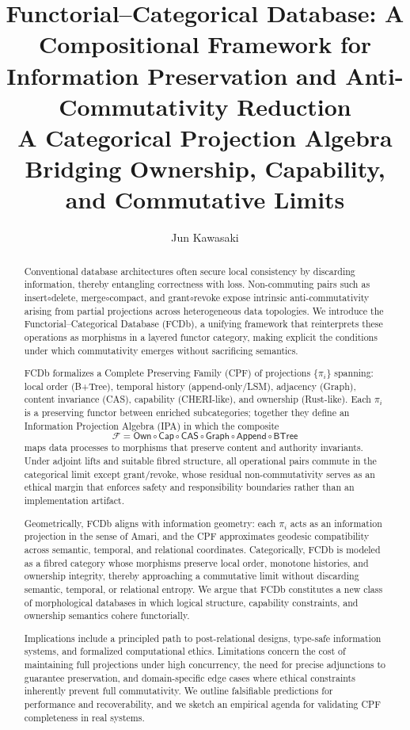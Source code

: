 \documentclass[10pt]{article}
\title{Functorial–Categorical Database: A Compositional Framework for Information Preservation and Anti-Commutativity Reduction\\
\large A Categorical Projection Algebra Bridging Ownership, Capability, and Commutative Limits}
\author{Jun Kawasaki}
\date{}
\begin{document}
\maketitle

\begin{abstract}
Conventional database architectures often secure local consistency by discarding information, thereby entangling correctness with loss. Non-commuting pairs such as insert$\circ$delete, merge$\circ$compact, and grant$\circ$revoke expose intrinsic anti-commutativity arising from partial projections across heterogeneous data topologies. We introduce the Functorial--Categorical Database (FCDb), a unifying framework that reinterprets these operations as morphisms in a layered functor category, making explicit the conditions under which commutativity emerges without sacrificing semantics.

FCDb formalizes a Complete Preserving Family (CPF) of projections $\{\pi_i\}$ spanning: local order (B+Tree), temporal history (append-only/LSM), adjacency (Graph), content invariance (CAS), capability (CHERI-like), and ownership (Rust-like). Each $\pi_i$ is a preserving functor between enriched subcategories; together they define an Information Projection Algebra (IPA) in which the composite
\[
\mathcal{F} = \mathsf{Own} \circ \mathsf{Cap} \circ \mathsf{CAS} \circ \mathsf{Graph} \circ \mathsf{Append} \circ \mathsf{BTree}
\]
maps data processes to morphisms that preserve content and authority invariants. Under adjoint lifts and suitable fibred structure, all operational pairs commute in the categorical limit except grant/revoke, whose residual non-commutativity serves as an ethical margin that enforces safety and responsibility boundaries rather than an implementation artifact.

Geometrically, FCDb aligns with information geometry: each $\pi_i$ acts as an information projection in the sense of Amari, and the CPF approximates geodesic compatibility across semantic, temporal, and relational coordinates. Categorically, FCDb is modeled as a fibred category whose morphisms preserve local order, monotone histories, and ownership integrity, thereby approaching a commutative limit without discarding semantic, temporal, or relational entropy. We argue that FCDb constitutes a new class of morphological databases in which logical structure, capability constraints, and ownership semantics cohere functorially.

Implications include a principled path to post-relational designs, type-safe information systems, and formalized computational ethics. Limitations concern the cost of maintaining full projections under high concurrency, the need for precise adjunctions to guarantee preservation, and domain-specific edge cases where ethical constraints inherently prevent full commutativity. We outline falsifiable predictions for performance and recoverability, and we sketch an empirical agenda for validating CPF completeness in real systems.


\end{abstract}
\end{document}
